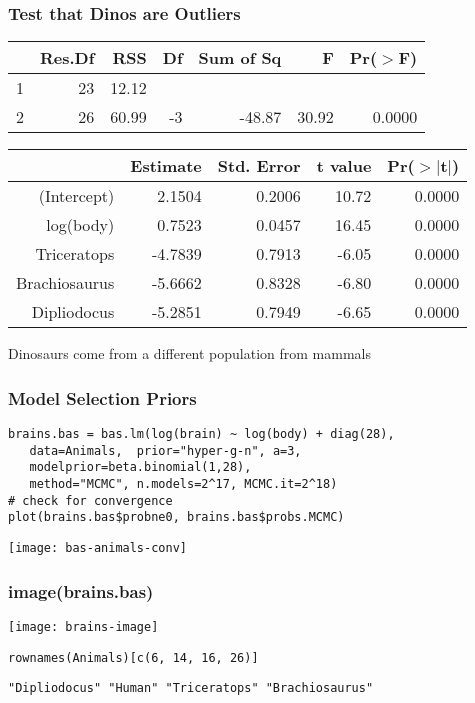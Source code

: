 \documentclass[]{beamer}
\begin{document}
  \begin{frame}
    \frametitle{Test that Dinos are Outliers}
    \begin{table}[ht]
\begin{center}
\begin{tabular}{lrrrrrr}
  \hline
 & Res.Df & RSS & Df & Sum of Sq & F & Pr($>$F) \\ 
  \hline
1 & 23 & 12.12 &  &  &  &  \\ 
  2 & 26 & 60.99 & -3 & -48.87 & 30.92 & 0.0000 \\ 
   \hline
\end{tabular}
\end{center}
\pause
\begin{table}[ht]
\begin{center}
\begin{tabular}{rrrrr}
  \hline
 & Estimate & Std. Error & t value & Pr($>$$|$t$|$) \\ 
  \hline
(Intercept) & 2.1504 & 0.2006 & 10.72 & 0.0000 \\ 
  log(body) & 0.7523 & 0.0457 & 16.45 & 0.0000 \\ 
  Triceratops & -4.7839 & 0.7913 & -6.05 & 0.0000 \\ 
  Brachiosaurus & -5.6662 & 0.8328 & -6.80 & 0.0000 \\ 
  Dipliodocus & -5.2851 & 0.7949 & -6.65 & 0.0000 \\ 
   \hline
\end{tabular}
\end{center}
\end{table}
\pause
Dinosaurs come from a different population from mammals
\end{table}
  \end{frame}
\begin{frame}[fragile]  \frametitle{Model Selection Priors}
\begin{verbatim}
brains.bas = bas.lm(log(brain) ~ log(body) + diag(28),
   data=Animals,  prior="hyper-g-n", a=3, 
   modelprior=beta.binomial(1,28), 
   method="MCMC", n.models=2^17, MCMC.it=2^18)
# check for convergence
plot(brains.bas$probne0, brains.bas$probs.MCMC)
\end{verbatim}
\texttt{[image: bas-animals-conv]}
\end{frame}

\begin{frame}  \frametitle{image(brains.bas)}
\texttt{[image: brains-image]}

{\tt rownames(Animals)[c(6, 14, 16, 26)]  }

{\tt "Dipliodocus" "Human" "Triceratops" "Brachiosaurus"}
\end{frame}
\end{document}
